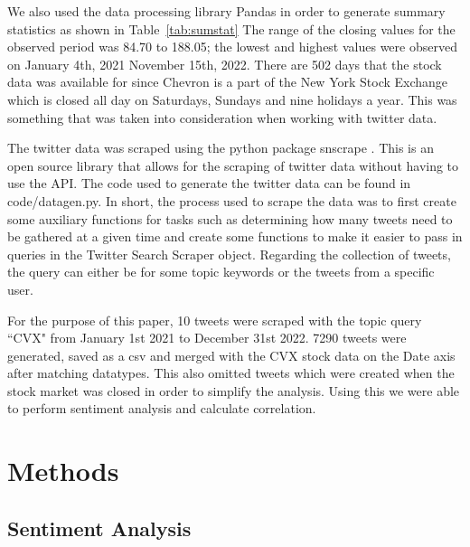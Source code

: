\documentclass[12pt, letterpaper, titlepage]{article}
\begin{document}
We also used the data processing library Pandas in order to generate summary statistics as shown in Table~\ref{tab:sumstat}
The range of the closing values for the observed period was 84.70 to 188.05; the lowest and highest values were observed on January 4th, 2021 November 15th, 2022. There are 502 days that the stock data was available for since Chevron is a part of the New York Stock Exchange which is closed all day on Saturdays, Sundays and nine holidays a year. This was something that was taken into consideration when working with twitter data. 


The twitter data was scraped using the python package snscrape \citep{justanotherarchivist_2022}. This is an open source library that allows for the scraping of twitter data without having to use the API. The code used to generate the twitter data can be found in code/datagen.py. In short, the process used to scrape the data was to first create some auxiliary functions for tasks such as determining how many tweets need to be gathered at a given time and create some functions to make it easier to pass in queries in the Twitter Search Scraper object. Regarding the collection of tweets, the query can either be for some topic keywords or the tweets from a specific user. 


For the purpose of this paper, 10 tweets were scraped with the topic query ``CVX" from January 1st 2021 to December 31st 2022.  7290 tweets were generated, saved as a csv and merged with the CVX stock data on the Date axis after matching datatypes. This also omitted tweets which were created when the stock market was closed in order to simplify the analysis. Using this we were able to perform sentiment analysis and calculate correlation.


\section{Methods}
\label{sec:methods}

\subsection{Sentiment Analysis}
\end{document}
